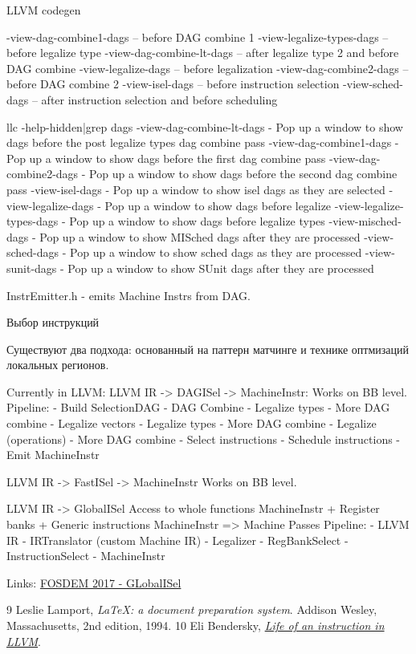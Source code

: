 \documentclass{article}
\begin{document}
LLVM codegen

-view-dag-combine1-dags   – before DAG combine 1
-view-legalize-types-dags – before legalize type
-view-dag-combine-lt-dags – after legalize type 2 and before DAG combine
-view-legalize-dags       – before legalization
-view-dag-combine2-dags   – before DAG combine 2
-view-isel-dags           – before instruction selection
-view-sched-dags          – after instruction selection and before scheduling

llc -help-hidden|grep dags
  -view-dag-combine-lt-dags                      - Pop up a window to show dags before the post legalize types dag combine pass
  -view-dag-combine1-dags                        - Pop up a window to show dags before the first dag combine pass
  -view-dag-combine2-dags                        - Pop up a window to show dags before the second dag combine pass
  -view-isel-dags                                - Pop up a window to show isel dags as they are selected
  -view-legalize-dags                            - Pop up a window to show dags before legalize
  -view-legalize-types-dags                      - Pop up a window to show dags before legalize types
  -view-misched-dags                             - Pop up a window to show MISched dags after they are processed
  -view-sched-dags                               - Pop up a window to show sched dags as they are processed
  -view-sunit-dags                               - Pop up a window to show SUnit dags after they are processed

InstrEmitter.h - emits Machine Instrs from DAG.


Выбор инструкций

Существуют два подхода: основанный на паттерн матчинге и технике оптмизаций локальных регионов.

Currently in LLVM: LLVM IR -> DAGISel -> MachineInstr:
Works on BB level.
Pipeline:
- Build SelectionDAG
- DAG Combine
- Legalize types
- More DAG combine
- Legalize vectors
- Legalize types
- More DAG combine
- Legalize (operations)
- More DAG combine
- Select instructions
- Schedule instructions
- Emit MachineInstr

LLVM IR -> FastISel -> MachineInstr
Works on BB level.

LLVM IR -> GlobalISel
Access to whole functions
MachineInstr
+ Register banks
+ Generic instructions
MachineInstr => Machine Passes
Pipeline:
- LLVM IR
- IRTranslator (custom Machine IR)
- Legalizer
- RegBankSelect
- InstructionSelect
- MachineInstr


Links:
\href{https://www.youtube.com/watch?v=d6dF6E4BPeU}{FOSDEM 2017 - GLobalISel}

	\begin{thebibliography}
		{9} Leslie Lamport, \emph{\LaTeX: a document preparation system}. Addison Wesley, Massachusetts, 2nd edition, 1994.
		{10} Eli Bendersky, \emph{\href{https://eli.thegreenplace.net/2012/11/24/life-of-an-instruction-in-llvm/}{Life of an instruction in LLVM}}.
	\end{thebibliography}
\end{document}
